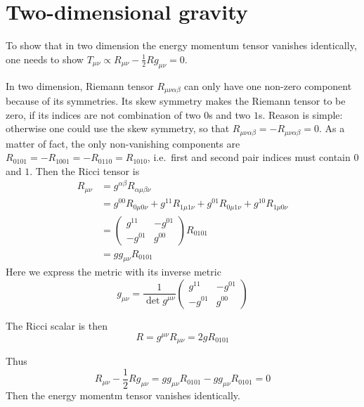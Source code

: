 \section{Two-dimensional gravity}
To show that in two dimension the energy momentum tensor vanishes identically, one needs to show $T_{\mu\nu} \propto R_{\mu\nu} - \frac{1}{2} R g_{\mu\nu} = 0$.

In two dimension, Riemann tensor $R_{\mu\nu\alpha\beta}$ can only have one non-zero component because of its symmetries. Its skew symmetry makes the Riemann tensor to be zero, if its indices are not combination of two $0$s and two $1$s. Reason is simple: otherwise one could use the skew symmetry, so that $R_{\mu\nu\alpha \beta} = -R_{\mu\nu\alpha\beta} = 0$. As a matter of fact, the only non-vanishing components are $R_{0101} = -R_{1001} = -R_{0110} = R_{1010}$, i.e.~first and second pair indices must contain $0$ and $1$. Then the Ricci tensor is
\begin{align*}
	R_{\mu\nu} &= g^{\alpha \beta }R_{\alpha\mu\beta\nu}  \\
				  &= g^{00} R_{0\mu0\nu} + g^{11} R_{1\mu1\nu} + g^{01} R_{0\mu1\nu} + g^{10} R_{1\mu0\nu}\\
				  &= \begin{pmatrix} g^{11} & -g^{01} \\ -g^{01} & g^{00} \end{pmatrix} R_{0101} \\
				  &= g g_{\mu\nu} R_{0101}
\end{align*}
Here we express the metric with its inverse metric
\begin{equation*}
	g_{\mu\nu} = \frac{1}{\det g^{\mu\nu}}  \begin{pmatrix} g^{11} & -g^{01} \\ -g^{01} & g^{00} \end{pmatrix}
\end{equation*}

The Ricci scalar is then
\begin{equation*}
	R = g^{\mu\nu} R_{\mu\nu}  = 2 g R_{0101}
\end{equation*}

Thus
\begin{equation}
	R_{\mu \nu} - \frac{1}{2} R g_{\mu\nu} = g g_{\mu\nu} R_{0101} - gg_{\mu\nu} R_{0101} = 0
\end{equation}
Then the energy momentm tensor vanishes identically.
